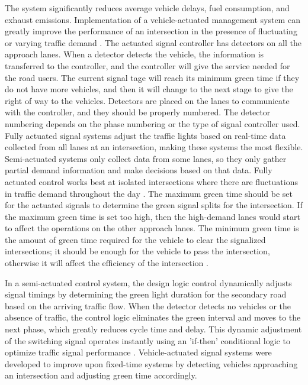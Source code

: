 The system significantly reduces average vehicle delays, fuel 
consumption, and exhaust emissions. Implementation of a vehicle-actuated 
management system can greatly improve the performance of an intersection 
in the presence of fluctuating or varying traffic demand
\cite{cakici2021}. The actuated signal controller has detectors 
on all the approach lanes. When a detector detects the vehicle, 
the information is transferred to the controller, and the controller 
will give the service needed for the road users. The current signal 
tage will reach its minimum green time if they do not have more 
vehicles, and then it will change to the next stage to give the 
right of way to the vehicles. Detectors are placed on the lanes 
to communicate with the controller, and they should be properly 
numbered. The detector numbering depends on the phase numbering 
or the type of signal controller used. Fully actuated signal systems 
adjust the traffic lights based on real-time data collected from 
all lanes at an intersection, making these systems the most flexible. 
Semi-actuated systems only collect data from some lanes, so they 
only gather partial demand information and make decisions based 
on that data. Fully actuated control works best at isolated intersections 
where there are fluctuations in traffic demand throughout the day 
\cite{urbanik2015}. The maximum green time should be set for 
the actuated signals to determine the green signal splits for the 
intersection. If the maximum green time is set too high, then the 
high-demand lanes would start to affect the operations on the other 
approach lanes. The minimum green time is the amount of green time 
required for the vehicle to clear the signalized intersections; it 
should be enough for the vehicle to pass the intersection, otherwise 
it will affect the efficiency of the intersection \cite{sinowatcher_actuatedsignals}.

In a semi-actuated control system, the design logic control dynamically 
adjusts signal timings by determining the green light duration for 
the secondary road based on the arriving traffic flow. When the detector 
detects no vehicles or the absence of traffic, the control logic eliminates 
the green interval and moves to the next phase, which greatly reduces 
cycle time and delay. This dynamic adjustment of the switching signal operates 
instantly using an 'if-then' conditional logic to optimize traffic signal 
performance  \cite{duraku2024}. Vehicle-actuated signal systems were 
developed to improve upon fixed-time systems by detecting vehicles approaching 
an intersection and adjusting green time accordingly.


